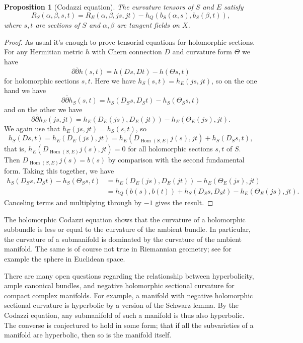 \documentclass[10pt,a4paper]{article}
\newtheorem{prop}[theo]{Proposition}
\newtheorem*{proof}{Proof}
\DeclareMathOperator{\Hom}{Hom}
\begin{document}
\begin{prop}[Codazzi equation]
\label{prop:codazzi-equation}
The curvature tensors of $S$ and $E$ satisfy
\[
R_S(\alpha,\beta,s,t)
= R_{E}(\alpha,\beta,js,jt)
- h_Q(b_S(\alpha,s), b_S(\beta,t)),
\]
where $s, t$ are sections of $S$ and $\alpha,\beta$ are tangent fields on $X$.
\end{prop}

\begin{proof}
As usual it's enough to prove tensorial equations for holomorphic sections. For any Hermitian metric $h$ with Chern connection $D$ and curvature form $\Theta$ we have
$$
\partial\bar\partial h(s,t)
= h(Ds,Dt) - h(\Theta s, t)
$$
for holomorphic sections $s,t$. Here we have $h_S(s,t) = h_E(js, jt)$, so on the one hand we have
$$
\partial\bar\partial h_S(s,t) =
h_S(D_S s, D_S t) - h_S(\Theta_S s, t)
$$
and on the other we have
$$
\partial\bar\partial h_E(js, jt)
= h_E(D_E(js), D_E(jt)) - h_E(\Theta_E (js), jt).
$$
We again use that $h_E(js,jt) = h_S(s,t)$, so
$$
h_S(Ds,t)
= h_E(D_E(js), jt)
= h_E(D_{\Hom(S,E)}j(s), jt) + h_S(D_S s,t),
$$
that is, $h_E(D_{\Hom(S,E)}j(s), jt) = 0$ for all holomorphic sections $s, t$ of $S$. Then $D_{\Hom(S,E)}j(s) = b(s)$ by comparison with the second fundamental form. Taking this together, we have
\begin{align*}
h_S(D_S s, D_S t) - h_S(\Theta_S s, t)
&= h_E(D_E(js), D_E(jt)) - h_E(\Theta_E (js), jt)
\\
&= h_Q(b(s),b(t)) + h_S(D_S s, D_S t) - h_E(\Theta_E (js), jt).
\end{align*}
Canceling terms and multiplying through by $-1$ gives the result.
\end{proof}

The holomorphic Codazzi equation shows that the curvature of a holomorphic subbundle is less or equal to the curvature of the ambient bundle. In particular, the curvature of a submanifold is dominated by the curvature of the ambient manifold. The same is of course not true in Riemannian geometry; see for example the sphere in Euclidean space.

There are many open questions regarding the relationship between hyperbolicity, ample canonical bundles, and negative holomorphic sectional curvature for compact complex manifolds. For example, a manifold with negative holomorphic sectional curvature is hyperbolic by a version of the Schwarz lemma. By the Codazzi equation, any submanifold of such a manifold is thus also hyperbolic. The converse is conjectured to hold in some form; that if all the subvarieties of a manifold are hyperbolic, then so is the manifold itself.
\end{document}
